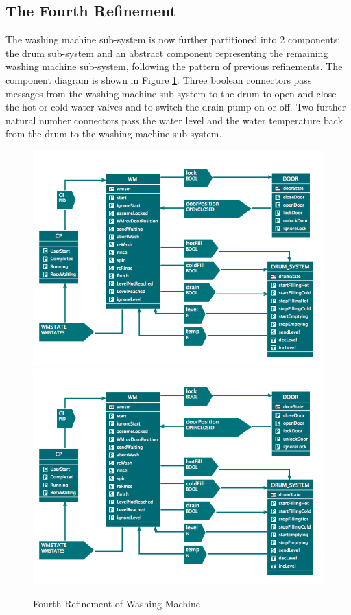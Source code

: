 \subsection{The Fourth Refinement}
\label{sec:component_diagrams-tutorial_fourthRefinement}

 
The washing machine sub-system is now further partitioned into 2 components: the drum sub-system and an abstract component representing the remaining washing machine sub-system, following the pattern of previous refinements.
The component diagram is shown in Figure \ref{fig:FourthRefinementOfWashingMachine}.
Three boolean connectors pass messages from the washing machine sub-system to the drum to open and close the hot or cold water valves and to switch the drain pump on or off. Two further natural number connectors pass the water level and the water temperature back from the drum to the washing machine sub-system.
 
 \begin{figure}[!htbp]
  \centering
  \ifplastex
  \includegraphics[width=1024]{figures/image41.png}
  \else
  \includegraphics[width=1\textwidth]{figures/image41.png}
  \fi
  \caption{Fourth Refinement of Washing Machine}
  \label{fig:FourthRefinementOfWashingMachine}
\end{figure} 
 
